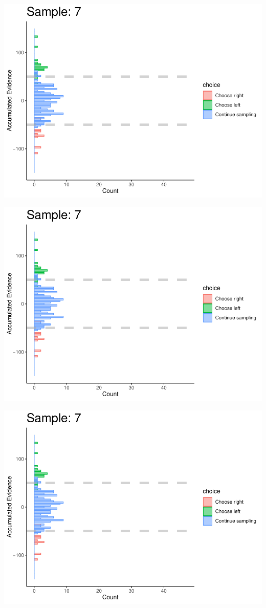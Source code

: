 \documentclass[
]{book}
\begin{document}
\begin{center}\includegraphics[width=0.8\linewidth]{LateNightBayes_files/figure-latex/fixed_check-61} \end{center}

\begin{center}\includegraphics[width=0.8\linewidth]{LateNightBayes_files/figure-latex/fixed_check-62} \end{center}

\begin{center}\includegraphics[width=0.8\linewidth]{LateNightBayes_files/figure-latex/fixed_check-63} \end{center}
\end{document}
